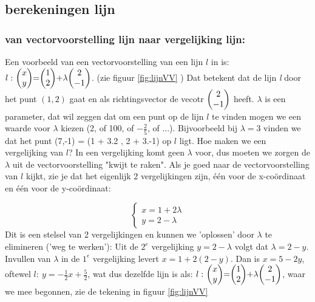 
\subsection{berekeningen lijn}

\subsubsection{van vectorvoorstelling lijn naar vergelijking lijn:} 
Een voorbeeld van een  vectorvoorstelling van een lijn $ l $ in \RT  is:
$ l: \ \vectwee {x}{y} = \vectwee {1}{2} + \lambda  \vectwee {2}{-1}  $.   (zie figuur \ref{fig:lijnVV} ) Dat betekent dat de lijn\textit{ l} door het punt $ (1,2) $ gaat en als richtingsvector de vecotr $ \vectwee {2}{-1} $ heeft. $ \lambda $  is een parameter, dat wil zeggen dat om een punt op de lijn $ l $ te vinden mogen we een waarde voor $ \lambda $  kiezen (2, of 100, of $ -\frac{2}{5} $, of ...). Bijvoorbeeld bij  $ \lambda= 3 $ vinden we dat het punt  (7,-1) = (1 + 3.2 , 2 + 3.-1)   op $ l $ ligt. Hoe maken we een vergelijking van  $ l $? In een vergelijking komt geen $ \lambda $ voor, dus moeten we zorgen de $ \lambda $ uit de vectorvoorstelling "kwijt te raken". Als je goed naar de vectorvoorstelling van $ l $ kijkt, zie je dat het eigenlijk 2 vergelijkingen zijn, één voor de x-coördinaat en één voor de y-coördinaat:

\[\begin{cases}
x = 1 + 2\lambda\\
y = 2 - \lambda 
\end{cases}
\] 
Dit is een stelsel van 2 vergelijkingen  en kunnen we 'oplossen' door $ \lambda $ te elimineren ('weg te werken'):
Uit de $ 2^{e}$ vergelijking $ y = 2 - \lambda $ volgt  dat $\lambda = 2 - y $. Invullen van  $ \lambda $ in de $ 1^{e}$ vergelijking levert $ x = 1 +2(2-y) $. Dan is $ x= 5 -2y $, oftewel $ l:  \ y = - \frac{1}{2}x + \frac{5}{2} $,  wat dus dezelfde lijn is als: $ l: \ \vectwee {x}{y} = \vectwee {1}{2} + \lambda  \vectwee {2}{-1}  $, waar we mee begonnen, zie de tekening in  figuur  \ref{fig:lijnVV}


